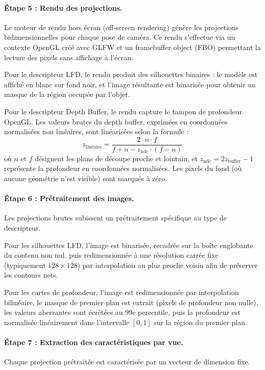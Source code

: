 \documentclass[11pt,a4paper,oneside]{report}
\begin{document}
\paragraph{Étape 5 : Rendu des projections.} Le moteur de rendu hors écran (off-screen rendering) génère les projections bidimensionnelles pour chaque pose de caméra. Ce rendu s'effectue via un contexte OpenGL créé avec GLFW et un framebuffer object (FBO) permettant la lecture des pixels sans affichage à l'écran.

Pour le descripteur LFD, le rendu produit des silhouettes binaires : le modèle est affiché en blanc sur fond noir, et l'image résultante est binarisée pour obtenir un masque de la région occupée par l'objet. 

Pour le descripteur Depth Buffer, le rendu capture le tampon de profondeur OpenGL. Les valeurs brutes du depth buffer, exprimées en coordonnées normalisées non linéaires, sont linéarisées selon la formule :
$$z_{\text{linéaire}} = \frac{2 \cdot n \cdot f}{f + n - z_{\text{ndc}} \cdot (f - n)}$$
où $n$ et $f$ désignent les plans de découpe proche et lointain, et $z_{\text{ndc}} = 2z_{\text{buffer}} - 1$ représente la profondeur en coordonnées normalisées. Les pixels du fond (où aucune géométrie n'est visible) sont marqués à zéro.

\paragraph{Étape 6 : Prétraitement des images.} Les projections brutes subissent un prétraitement spécifique au type de descripteur.

Pour les silhouettes LFD, l'image est binarisée, recadrée sur la boîte englobante du contenu non nul, puis redimensionnée à une résolution carrée fixe (typiquement $128 \times 128$) par interpolation au plus proche voisin afin de préserver les contours nets.

Pour les cartes de profondeur, l'image est redimensionnée par interpolation bilinéaire, le masque de premier plan est extrait (pixels de profondeur non nulle), les valeurs aberrantes sont écrêtées au 99e percentile, puis la profondeur est normalisée linéairement dans l'intervalle $[0, 1]$ sur la région du premier plan.

\paragraph{Étape 7 : Extraction des caractéristiques par vue.} Chaque projection prétraitée est caractérisée par un vecteur de dimension fixe.
\end{document}
